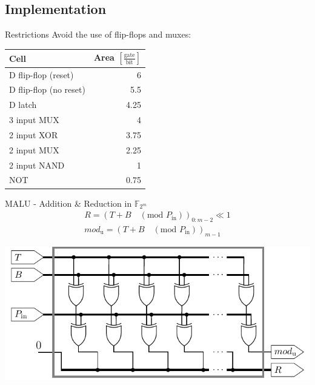 \documentclass[svgnames]{beamer}
\newenvironment{changemargin}[2]{%
\begin{list}{}{%
\setlength{\topsep}{0pt}%
\setlength{\leftmargin}{#1}%
\setlength{\rightmargin}{#2}%
\setlength{\listparindent}{\parindent}%
\setlength{\itemindent}{\parindent}%
\setlength{\parsep}{\parskip}%
}%
\item[]}{\end{list}}
\begin{document}
\subsection*{Implementation}
\begin{frame}{Restrictions}
Avoid the use of flip-flops and muxes:

	\begin{center}
	\begin{tabular}{lr}
		\toprule
		Cell							& Area $\left[\frac{\text{gate}}{\text{bit}}\right]$\\
		\midrule
		D flip-flop (reset)		& 6\\
		D flip-flop (no reset)	& 5.5\\
		D latch						& 4.25\\
		3 input MUX					& 4\\
		2 input XOR					& 3.75\\
		2 input MUX					& 2.25\\
		2 input NAND				& 1\\
		NOT							& 0.75\\
		\bottomrule
	\end{tabular}
	\end{center}
\end{frame}

\begin{frame}{MALU - Addition \& Reduction in $\mathbb{F}_{2^m}$}
\\[-1em]
	\[\begin{gathered}
		R = \left(T + B \quad (\text{mod } P_{\text{in}}) \right)_{0:m-2} \ll 1 \\
		mod_{\text{u}} = \left(T + B \quad (\text{mod } P_{\text{in}}) \right)_{m - 1}
	\end{gathered}\]
	\begin{changemargin}{-2cm}{-2cm}
	\begin{center}\includegraphics[height=0.5\paperheight]{images/malu-basic}\end{center}
	\end{changemargin}
\end{frame}
\end{document}
